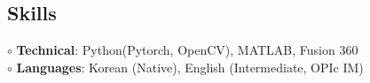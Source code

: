 \documentclass[a4paper,9pt]{extarticle}
\begin{document}
\begin{spacing}{1.05}



\section*{Skills}

\noindent $\circ$  \textbf{Technical}: Python(Pytorch, OpenCV), MATLAB, Fusion 360 \\
\noindent $\circ$  \textbf{Languages}: Korean (Native), English (Intermediate, OPIc IM)







\end{spacing}
\end{document}
